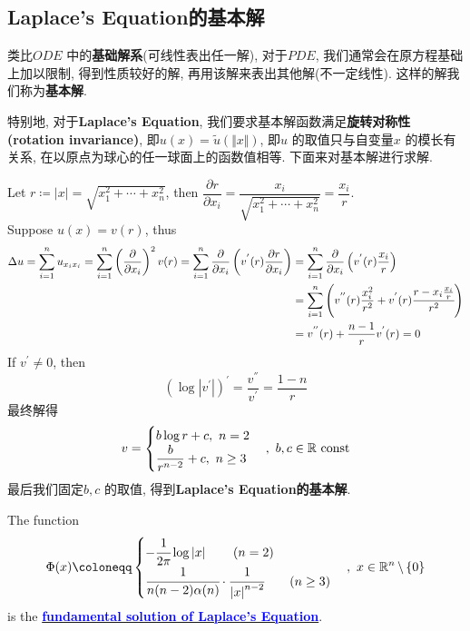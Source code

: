 \newpage
\subsection{Laplace's Equation的基本解}
	类比$ODE$ 中的\textbf{基础解系}(可线性表出任一解), 对于$PDE$, 我们通常会在原方程基础上加以限制, 得到性质较好的解, 再用该解来表出其他解(不一定线性). 这样的解我们称为\textbf{基本解}. 
	
	\vspace{1em}
	
	特别地, 对于\textbf{Laplace's Equation}, 我们要求基本解函数满足\textbf{旋转对称性 (rotation invariance)}, 即$u(x) = \widetilde{u} (\Vert x \Vert)$, 即$u$ 的取值只与自变量$x$ 的模长有关系, 在以原点为球心的任一球面上的函数值相等. 下面来对基本解进行求解. 
	
	\vspace{4em}
	
	Let $r \coloneqq \left| x \right| = \sqrt{x_{1}^2 + \cdots + x_{n}^2}$, then $\dfrac{\partial r}{\partial x_i} = \dfrac{x_i}{\sqrt{x_{1}^2 + \cdots + x_{n}^2}} = \dfrac{x_i}{r}$. \\
	Suppose $u(x) = v(r)$, thus
	\begin{align}
		\Delta u 
		= \sum_{i = 1}^{n} u_{x_i x_i} 
		= \sum_{i = 1}^{n} \left( \frac{\partial}{\partial x_i} \right)^2 v(r) 
		= \sum_{i = 1}^{n} \frac{\partial}{\partial x_i} \left( v^{'}(r) \frac{\partial r}{\partial x_i} \right) 
		&= \sum_{i = 1}^{n} \frac{\partial}{\partial x_i} \left( v^{'}(r) \frac{x_i}{r} \right) \\
		&= \sum_{i = 1}^{n} \left( v^{''}(r) \frac{x_{i}^2}{r^2} + v^{'}(r) \cfrac{r - x_i \frac{x_i}{r}}{r^2} \right) \\
		&= v^{''}(r) + \frac{n - 1}{r} v^{'}(r) = 0
	\end{align}
	If $v^{'} \neq 0$, then 
	\[ \left( \log \left| v^{'} \right| \right)^{'} = \frac{v^{''}}{v^{'}} = \frac{1 - n}{r} \]
	最终解得
	\begin{align}
		v = 
		\begin{cases}
			b \log r + c , \,\, n = 2 \\
			\dfrac{b}{r^{n - 2}} + c , \,\, n \geq 3
		\end{cases} , \,\, b , c \in \mathbb{R} \,\, \text{const}
	\end{align}
	最后我们固定$b , c$ 的取值, 得到\textbf{Laplace's Equation的基本解}. 
	
	\vspace{2em}
	\begin{defn}\label{def 2.1.2}
		The function
		\begin{align}
			\Phi(x) \coloneqq 
			\begin{cases}
				-\cfrac{1}{2 \pi} \log \left| x \right| \hspace*{2em} (n = 2) \\
				\cfrac{1}{n (n - 2) \alpha(n)} \cdot \cfrac{1}{\left| x \right|^{n - 2}} \hspace*{2em} (n \geq 3)
			\end{cases} , \,\, x \in \R^n \, \backslash \, \{ 0 \}
		\end{align}
		is the \underline{\textcolor{blue}{\textbf{fundamental solution of Laplace's Equation}}}.
	\end{defn}

